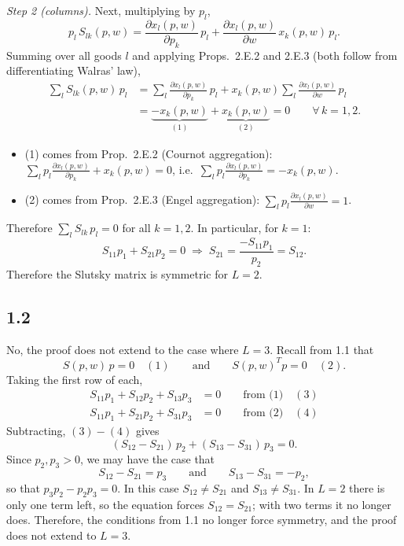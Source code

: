 \documentclass[12pt,letterpaper]{article}
\begin{document}
\textit{Step 2 (columns).} Next, multiplying by $p_l$,
\[
p_l\, S_{lk}(p,w)
= \frac{\partial x_l(p,w)}{\partial p_k}\,p_l
+ \frac{\partial x_l(p,w)}{\partial w}\, x_k(p,w)\,p_l .
\]
Summing over all goods $l$ and applying Props.~2.E.2 and 2.E.3 (both follow from differentiating Walras' law),
\begin{align*}
\sum_l S_{lk}(p,w)\,p_l
&= \sum_l \frac{\partial x_l(p,w)}{\partial p_k}\,p_l
 + x_k(p,w)\sum_l \frac{\partial x_l(p,w)}{\partial w}\,p_l \\
&= \underbrace{-x_k(p,w)}_{(1)} + \underbrace{x_k(p,w)}_{(2)} = 0
\qquad \forall\, k=1,2 .
\end{align*}
\begin{itemize}
  \item (1) comes from Prop.~2.E.2 (Cournot aggregation):
  $\displaystyle\sum_l p_l\frac{\partial x_l(p,w)}{\partial p_k} + x_k(p,w) = 0$, i.e.\
  $\displaystyle\sum_l p_l\frac{\partial x_l(p,w)}{\partial p_k} = -x_k(p,w)$.
  \item (2) comes from Prop.~2.E.3 (Engel aggregation):
  $\displaystyle\sum_l p_l\frac{\partial x_l(p,w)}{\partial w} = 1$.
\end{itemize}
Therefore $\sum_l S_{lk}\,p_l = 0$ for all $k=1,2$. In particular, for $k=1$:
\[
S_{11}p_1 + S_{21}p_2 = 0 \;\Longrightarrow\; S_{21} = \frac{-S_{11}p_1}{p_2} = S_{12}.
\]
Therefore the Slutsky matrix is symmetric for $L=2$.



\subsection*{1.2}

No, the proof does not extend to the case where $L=3$. Recall from 1.1 that
\[
S(p,w)\,p = 0 \quad (1) \qquad\text{and}\qquad S(p,w)^{T} p = 0 \quad (2).
\]
Taking the first row of each,
\begin{align*}
S_{11}p_1 + S_{12}p_2 + S_{13}p_3 &= 0 \qquad \text{from (1)} \quad (3)\\
S_{11}p_1 + S_{21}p_2 + S_{31}p_3 &= 0 \qquad \text{from (2)} \quad (4)
\end{align*}
Subtracting, $(3)-(4)$ gives
\[
(S_{12}-S_{21})\,p_2 + (S_{13}-S_{31})\,p_3 = 0 .
\]
Since $p_2, p_3 > 0$, we may have the case that
\[
S_{12}-S_{21} = p_3 \qquad\text{and}\qquad S_{13}-S_{31} = -p_2,
\]
so that $p_3p_2 - p_2p_3 = 0$. In this case $S_{12}\neq S_{21}$ and $S_{13}\neq S_{31}$. In $L=2$ there is only one term left, so the equation forces $S_{12}=S_{21}$; with two terms it no longer does. Therefore, the conditions from 1.1 no longer force symmetry, and the proof does not extend to $L=3$.
\end{document}
